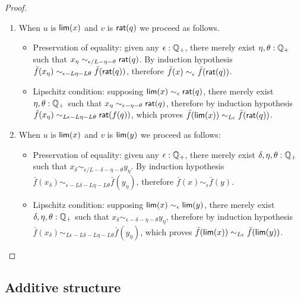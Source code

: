\begin{proof}
\begin{enumerate}
  \item When $u$ is $\mathsf{lim}(x)$ and $v$ is $\mathsf{rat}(q)$ we proceed as follows.
    \begin{itemize}
    \item Preservation of equality: given any $\epsilon : \mathbb{Q}_{+}$, there merely exist $\eta,
      \theta : \mathbb{Q}_{+}$ such that $x_\eta \sim_{\epsilon/L - \eta - \theta} \mathsf{rat}(q)$. By
      induction hypothesis $\bar{f}(x_\eta) \sim_{\epsilon - L \eta - L \theta}
      \bar{f}(\mathsf{rat}(q))$, therefore $\bar{f}(x) \sim_\epsilon \bar{f}(\mathsf{rat}(q))$.

    \item Lipschitz condition:
      supposing $\mathsf{lim}(x) \sim_\epsilon \mathsf{rat}(q)$, there merely exist $\eta, \theta :
      \mathbb{Q}_{+}$ such that $x_\eta \sim_{\epsilon - \eta - \theta} \mathsf{rat}(q)$, therefore by
      induction hypothesis $\bar{f}(x_\eta) \sim_{L \epsilon - L \eta - L \theta}
      \mathsf{rat}(f(q))$, which proves $\bar{f}(\mathsf{lim}(x)) \sim_{L \epsilon}
      \bar{f}(\mathsf{rat}(q))$.
    \end{itemize}

  \item When $u$ is $\mathsf{lim}(x)$ and $v$ is $\mathsf{lim}(y)$ we proceed as follows:
    \begin{itemize}
    \item Preservation of equality: given any $\epsilon : \mathbb{Q}_{+}$, there merely exist
      $\delta, \eta, \theta : \mathbb{Q}_{+}$ such that $x_\delta \sim_{\epsilon/L - \delta - \eta -
        \theta} y_\eta$. By induction hypothesis $\bar{f}(x_\delta) \sim_{\epsilon - L
        \delta - L \eta - L \theta} \bar{f}(y_\eta)$, therefore $\bar{f}(x) \sim_\epsilon
      \bar{f}(y)$.

    \item Lipschitz condition:
      supposing $\mathsf{lim}(x) \sim_\epsilon \mathsf{lim}(y)$, there merely exist $\delta, \eta,
      \theta : \mathbb{Q}_{+}$ such that $x_\delta \sim_{\epsilon - \delta - \eta - \theta} y_\eta$,
      therefore by induction hypothesis $\bar{f}(x_\delta) \sim_{L \epsilon - L \delta - L
        \eta - L \theta} \bar{f}(y_\eta)$, which proves $\bar{f}(\mathsf{lim}(x)) \sim_{L
        \epsilon} \bar{f}(\mathsf{lim}(y))$.
    \end{itemize}
  \end{enumerate}
\end{proof}

\subsection{Additive structure}
\label{sec:additive-structure-order}

